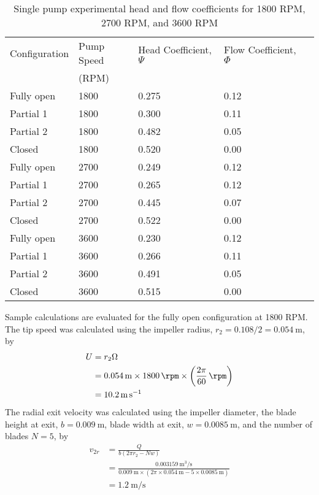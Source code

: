 \begin{table}[H]
    \centering
    \caption{Single pump experimental head and flow coefficients for 1800 RPM, 2700 RPM, and 3600 RPM}
    \label{tab:single_pump_head_and_flow_coefficients}
    \begin{tabular}{lC{0.15\textwidth}C{0.15\textwidth}C{0.15\textwidth}C{0.15\textwidth}}
    \toprule
    Configuration & Pump Speed & Head Coefficient, $\Psi$ & Flow Coefficient, $\Phi$ \\
    & (RPM) &  &  \\
    \midrule
    Fully open & 1800 & 0.275 & 0.12 \\
    Partial 1 & 1800 & 0.300 & 0.11 \\
    Partial 2 & 1800 & 0.482 & 0.05 \\
    Closed & 1800 & 0.520 & 0.00 \\
    Fully open & 2700 & 0.249 & 0.12 \\
    Partial 1 & 2700 & 0.265 & 0.12 \\
    Partial 2 & 2700 & 0.445 & 0.07 \\
    Closed & 2700 & 0.522 & 0.00 \\
    Fully open & 3600 & 0.230 & 0.12 \\
    Partial 1 & 3600 & 0.266 & 0.11 \\
    Partial 2 & 3600 & 0.491 & 0.05 \\
    Closed & 3600 & 0.515 & 0.00 \\
    \bottomrule
    \end{tabular}
\end{table}
\noindent Sample calculations are evaluated for the fully open configuration at 1800 RPM. The tip speed was calculated using the impeller radius, $r_2 = 0.108/2 = \qty{0.054}{\meter}$, by
\begin{align*}
    U &= r_2 \Omega \\
    &= \qty{0.054}{\meter} \times \qty{1800}{\rpm} \times \left(\frac{2\pi}{60}\,\unit{\per\rpm}\right) \\
    &= \qty{10.2}{\meter\per\second}
\end{align*}
The radial exit velocity was calculated using the impeller diameter, the blade height at exit, $b = \qty{0.009}{\meter}$, blade width at exit, $w = \qty{0.0085}{\meter}$, and the number of blades $N=5$, by
\begin{align*}
    v_{2r} &= \frac{Q}{b(2\pi r_2 - Nw)} \\
    &= \frac{\qty{0.003159}{\meter\cubed\per\second}}{\qty{0.009}{\meter} \times (2\pi \times \qty{0.054}{\meter} - 5 \times \qty{0.0085}{\meter})} \\
    &= \qty{1.2}{\meter\per\second}
\end{align*}

